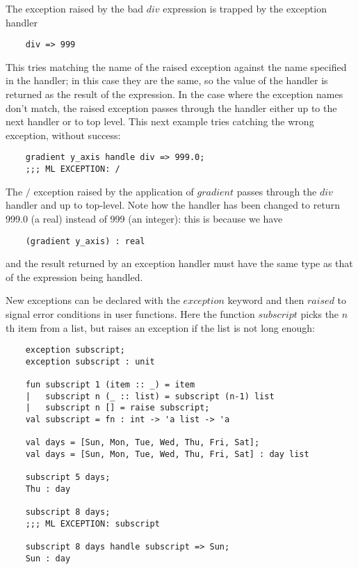 The exception raised by the bad $div$ expression is trapped by the
exception handler
\begin{verbatim}
    div => 999
\end{verbatim}

This tries matching the name of the raised exception against the name
specified in the handler; in this case they are the same, so the value
of the handler is returned as the result of the expression. In the case
where the exception names don't match, the raised exception passes
through the handler either up to the next handler or to top level. This
next example tries catching the wrong exception, without success:
\begin{verbatim}
    gradient y_axis handle div => 999.0;
    ;;; ML EXCEPTION: /
\end{verbatim}

The $/$ exception raised by the application of $gradient$ passes through
the $div$ handler and up to top-level. Note how the handler has been
changed to return 999.0 (a real) instead of 999 (an integer): this is
because we have
\begin{verbatim}
    (gradient y_axis) : real
\end{verbatim}

and the result returned by an exception handler must have the same type
as that of the expression being handled.

New exceptions can be declared with the $exception$ keyword and then
$raised$ to signal error conditions in user functions. Here the function
$subscript$ picks the $n$th item from a list, but raises an exception if
the list is not long enough:
\begin{verbatim}
    exception subscript;
    exception subscript : unit

    fun subscript 1 (item :: _) = item
    |   subscript n (_ :: list) = subscript (n-1) list
    |   subscript n [] = raise subscript;
    val subscript = fn : int -> 'a list -> 'a

    val days = [Sun, Mon, Tue, Wed, Thu, Fri, Sat];
    val days = [Sun, Mon, Tue, Wed, Thu, Fri, Sat] : day list

    subscript 5 days;
    Thu : day

    subscript 8 days;
    ;;; ML EXCEPTION: subscript

    subscript 8 days handle subscript => Sun;
    Sun : day
\end{verbatim}

